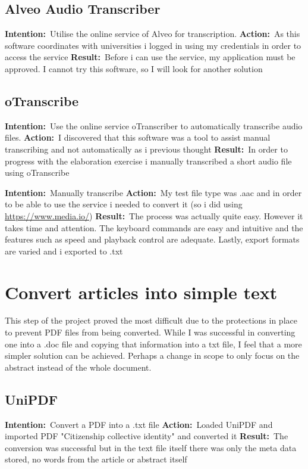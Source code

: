 \documentclass{article}
\newcommand{\intention}[1]{\noindent \textbf{Intention:}{\textnormal\ #1} \newline}
\newcommand{\action}[1]{\textbf{Action:}{\textnormal\ #1} \newline}
\newcommand{\result}[1]{\textbf{Result:}{\textnormal\ #1} \newline}
\begin{document}
\subsection{Alveo Audio Transcriber}

\intention{Utilise the online service of Alveo for transcription.}
\action{As this software coordinates with universities i logged in using my credentials in order to access the service}
\result{Before i can use the service, my application must be approved. I cannot try this software, so I will look for another solution}

\subsection{oTranscribe}

\intention{Use the online service oTranscriber to automatically transcribe audio files.}
\action{I discovered that this software was a tool to assist manual transcribing and not automatically as i previous thought}
\result{In order to progress with the elaboration exercise i manually transcribed a short audio file using oTranscribe}

\intention{Manually transcribe}
\action{My test file type was .aac and in order to be able to use the service i needed to convert it (so i did using \url{https://www.media.io/})}
\result{The process was actually quite easy. However it takes time and attention. The keyboard commands are easy and intuitive and the features such as speed and playback control are adequate. Lastly, export formats are varied and i exported to .txt}



\section{Convert articles into simple text}
This step of the project proved the most difficult due to the protections in place to prevent PDF files from being converted. While I was successful in converting one into a .doc file and copying that information into a txt file, I feel that a more simpler solution can be achieved. Perhaps a change in scope to only focus on the abstract instead of the whole document.
\subsection{UniPDF}
\intention{Convert a PDF into a .txt file}
\action{Loaded UniPDF and imported PDF "Citizenship collective identity" and converted it}
\result{The conversion was successful but in the text file itself there was only the meta data stored, no words from the article or abstract itself}
\end{document}
